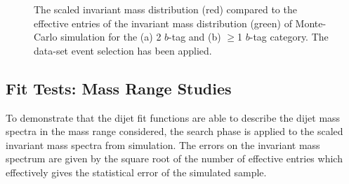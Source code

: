 \begin{figure}[!ht]
  \begin{center}
    \captionsetup[subfigure]{aboveskip=0pt,justification=centering}
  \end{center}
  \caption{The scaled invariant mass distribution (red) compared to the
    effective entries of the invariant mass distribution (green)
    of Monte-Carlo simulation for the (a) 2 $b$-tag and (b) $\geq$1 $b$-tag category.
    The \summer{} data-set event selection has been applied.}
  \label{fig:effEnt}
\end{figure}

\subsection{Fit Tests: Mass Range Studies}
\label{sec:bkg-summer_range}

To demonstrate that the dijet fit functions are able to describe the dijet mass spectra in the mass range considered,
the search phase is applied to the scaled invariant mass spectra from simulation.
The errors on the invariant mass spectrum are given by the square root of the number of effective entries
which effectively gives the statistical error of the simulated sample.

